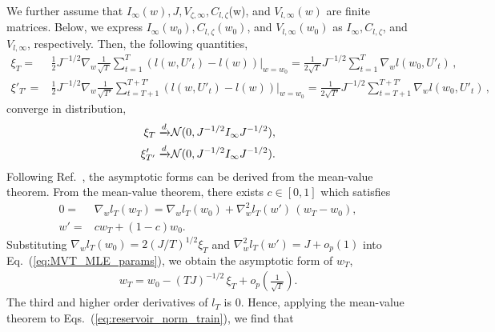 \documentclass{article}
\newcommand{\com}[1]{{\sf\color[rgb]{0,0,1}{#1}}}
\begin{document}
We further assume that $I_\infty(w), J, V_{\zeta, \infty}, C_{l,\zeta}$(w), and $V_{l, \infty}(w)$ are finite matrices. 
Below, we express $I_\infty(w_0), C_{l,\zeta}(w_0)$, and $V_{l, \infty}(w_0)$ as $I_\infty, C_{l,\zeta}$, and $V_{l, \infty}$, respectively. 
Then, the following quantities, 
\begin{align}
 \xi_T 
  =& \frac{1}{2} J^{-1/2} \nabla_w \frac{1}{\sqrt{T}} \sum_{t=1}^T (l(w, U'_t) - l(w)) \Bigr|_{w=w_0}
  = \frac{1}{2 \sqrt{T}} J^{-1/2} \sum_{t=1}^T \nabla_w l(w_0, U'_t) \, , \\
 \xi'_{T'} 
  =& \frac{1}{2} J^{-1/2} \nabla_w \frac{1}{\sqrt{T'}} \sum_{t=T+1}^{T+T'} (l(w, U'_t) - l(w)) \Bigr|_{w=w_0}
  = \frac{1}{2 \sqrt{T'}} J^{-1/2} \sum_{t=T+1}^{T+T'} \nabla_w l(w_0, U'_t) \, ,
\end{align}
converge in distribution,  
\begin{align}
 \xi_T \xrightarrow{d}& {\cal N}(0, J^{-1/2} I_\infty J^{-1/2}),
  \label{eq:xi_converge} \\
 \xi'_{T'} \xrightarrow{d}& {\cal N}(0, J^{-1/2} I_\infty J^{-1/2}). 
  \label{eq:xi'_converge}
\end{align}
Following Ref.~\cite{watanabe2009algebraic}, the asymptotic forms can be derived from the mean-value theorem. 
From the mean-value theorem, there exists $c \in [0, 1]$ which satisfies 
\begin{align}
 0 =& \nabla_w l_T(w_T) = \nabla_w l_T(w_0) + \nabla_w^2 l_T(w') \, (w_T - w_0), 
 \label{eq:MVT_MLE_params} \\
 w' =& c w_T + (1 - c) w_0. 
\end{align}
Substituting $\nabla_w l_T(w_0) = 2 (J / T)^{1/2} \xi_T$ and $\nabla_w^2 l_T(w') = J + o_p(1)$ into Eq.~(\ref{eq:MVT_MLE_params}), we obtain the asymptotic form of $w_T$, 
\begin{align}
 w_T = w_0 - (T J)^{-1/2} \, \xi_T + o_p\left( \frac{1}{\sqrt{T}}\right).
  \label{eq:MLE_params_convergence}
\end{align}
The third and higher order derivatives of $l_T$ is $0$. 
Hence, applying the mean-value theorem to Eqs.~(\ref{eq:reservoir_norm_train}), we find that 
\end{document}
